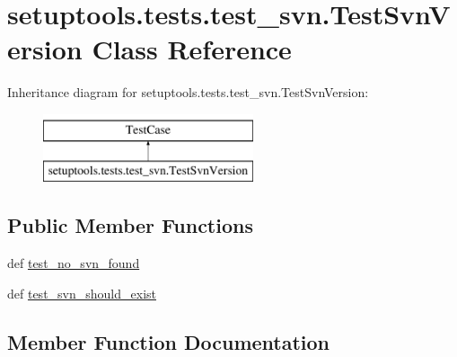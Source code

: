\hypertarget{classsetuptools_1_1tests_1_1test__svn_1_1TestSvnVersion}{}\section{setuptools.\+tests.\+test\+\_\+svn.\+Test\+Svn\+Version Class Reference}
\label{classsetuptools_1_1tests_1_1test__svn_1_1TestSvnVersion}
Inheritance diagram for setuptools.\+tests.\+test\+\_\+svn.\+Test\+Svn\+Version\+:\begin{figure}[H]
\begin{center}
\leavevmode
\includegraphics[height=2.000000cm]{classsetuptools_1_1tests_1_1test__svn_1_1TestSvnVersion}
\end{center}
\end{figure}
\subsection*{Public Member Functions}
\begin{DoxyCompactItemize}
\item 
def \hyperlink{classsetuptools_1_1tests_1_1test__svn_1_1TestSvnVersion_a9dea668605ebb51c3145edece0e56ccc}{test\+\_\+no\+\_\+svn\+\_\+found}
\item 
def \hyperlink{classsetuptools_1_1tests_1_1test__svn_1_1TestSvnVersion_a98eacbe89d7a1eaf8de442c8fad0fead}{test\+\_\+svn\+\_\+should\+\_\+exist}
\end{DoxyCompactItemize}


\subsection{Member Function Documentation}
\hypertarget{classsetuptools_1_1tests_1_1test__svn_1_1TestSvnVersion_a9dea668605ebb51c3145edece0e56ccc}{}

